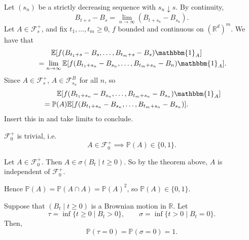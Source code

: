 \documentclass[12pt]{article}
\begin{document}
\begin{proofbox}
	Let $(s_n)$ be a strictly decreasing sequence with $s_n \downarrow s$. By continuity,
	\[
	B_{t + s} - B_s = \lim_{n \to \infty}(B_{t + s_n} - B_{s_n}).
	\]
	Let $A \in \mathcal{F}_s^{+}$, and fix $t_1, \ldots, t_m \geq 0$, $f$ bounded and continuous on $(\mathbb{R}^{d})^{m}$. We have that
	\begin{align*}
		& \qquad\mathbb{E}[f(B_{t_1 + s} - B_s, \ldots, B_{t_m+s} - B_s) \mathbbm{1}_{A}] \\
		&= \lim_{n \to \infty} \mathbb{E}[f(B_{t_1 + s_n} - B_{s_n}, \ldots, B_{t_m + s_n} - B_n) \mathbbm{1}_{A}].
	\end{align*}
	Since $A \in \mathcal{F}_s^{+}$, $A \in \mathcal{F}_{s_n}^B$ for all $n$, so
	\begin{align*}
		& \qquad \mathbb{E}[f(B_{t_1 + s_n} - B_{s_n}, \ldots, B_{t_m + s_n} - B_{s_n}) \mathbbm{1}_{A}] \\
		&= \mathbb{P}(A) \mathbb{E}[f(B_{t_1+s_n} - B_{s_n}, \ldots, B_{t_m+s_n} - B_{s_n})].
	\end{align*}
	Insert this in and take limits to conclude.
\end{proofbox}

\begin{theorem}
	$\mathcal{F}_0^+$ is trivial, i.e.
	\[
		A \in \mathcal{F}_0^+ \implies \mathbb{P}(A) \in \{0, 1\}.
	\]
\end{theorem}

\begin{proofbox}
	Let $A \in \mathcal{F}_0^+$. Then $A \in \sigma(B_t \mid t \geq 0)$. So by the theorem above, $A$ is independent of $\mathcal{F}_0^+$.

	Hence $\mathbb{P}(A) = \mathbb{P}(A \cap A) = \mathbb{P}(A)^2$, so $\mathbb{P}(A) \in \{0, 1\}$.
\end{proofbox}

\begin{theorem}
	Suppose that $(B_t \mid t \geq 0)$ is a Brownian motion in $\mathbb{R}$. Let
	\[
		\tau = \inf \{ t \geq 0 \mid B_t > 0\}, \qquad \sigma = \inf\{t > 0 \mid B_t = 0\}.
	\]
	Then,
	\[
	\mathbb{P}(\tau = 0) = \mathbb{P}(\sigma = 0) = 1.
	\]
\end{theorem}
\end{document}
